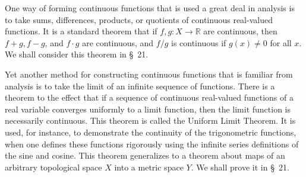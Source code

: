 One way of forming continuous functions that is used a great deal in analysis is to take sums, differences, products, or quotients of continuous real-valued functions. It is a standard theorem that if \(f,g : X \rightarrow \mathbb{R}\) are continuous, then \(f + g,f - g\), and \(f \cdot g\) are continuous, and \(f/g\) is continuous if \(g(x) \neq 0\) for all \(x\). We shall consider this theorem in \S\ 21.

Yet another method for constructing continuous functions that is familiar from analysis is to take the limit of an infinite sequence of functions. There is a theorem to the effect that if a sequence of continuous real-valued functions of a real variable converges uniformly to a limit function, then the limit function is necessarily continuous. This theorem is called the Uniform Limit Theorem. It is used, for instance, to demonstrate the continuity of the trigonometric functions, when one defines these functions rigorously using the infinite series definitions of the sine and cosine. This theorem generalizes to a theorem about maps of an arbitrary topological space \(X\) into a metric space \(Y\). We shall prove it in \S\ 21.

